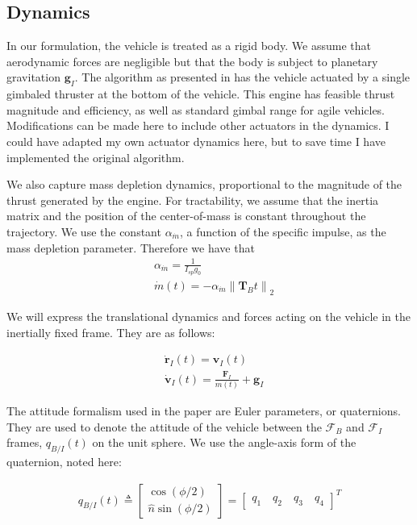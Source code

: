\documentclass[conf]{new-aiaa}
\begin{document}
\begin{singlespace}
\subsection{Dynamics}
In our formulation, the vehicle is treated as a rigid body. We assume that aerodynamic forces are negligible but that the body is subject to planetary gravitation $\mathbf{g}_I$. The algorithm as presented in \cite{6dofsucc} has the vehicle actuated by a single gimbaled thruster at the bottom of the vehicle. This engine has feasible thrust magnitude and efficiency, as well as standard gimbal range for agile vehicles. Modifications can be made here to include other actuators in the dynamics. I could have adapted my own actuator dynamics here, but to save time I have implemented the original algorithm.

We also capture mass depletion dynamics, proportional to the magnitude of the thrust generated by the engine. For tractability, we assume that the inertia matrix and the position of the center-of-mass is constant throughout the trajectory. We use the constant $\alpha_{\dot{m}}$, a function of the specific impulse, as the mass depletion parameter. Therefore we have that
\begin{align}
& \alpha_{\dot{m}} = \frac{1}{I_{sp} g_0} \\
& \dot{m}(t) = -\alpha_{\dot{m}} \left\lVert \mathbf{T}_B{t} \right\rVert _2
\end{align}

We will express the translational dynamics and forces acting on the vehicle in the inertially fixed frame. They are as follows:

\begin{align}
& \dot{\mathbf{r}}_I(t) = \mathbf{v}_I(t) \\
& \dot{\mathbf{v}}_I(t) = \frac{\mathbf{F}_I}{m(t)} + \mathbf{g}_I
\end{align}

The attitude formalism used in the paper are Euler parameters, or quaternions. They are used to denote the attitude of the vehicle between the $\mathcal{F}_B$ and $\mathcal{F}_I$ frames, $q_{B/I}(t)$ on the unit sphere. We use the angle-axis form of the quaternion, noted here:

\begin{align}
q_{B/I}(t) \triangleq 
	\begin{bmatrix}
	\cos(\phi/2) \\ \hat{n}\sin(\phi/2)
	\end{bmatrix}
	= 
	\begin{bmatrix}
	q_1 \quad q_2 \quad q_3 \quad q_4
	\end{bmatrix}^T
\end{align}


\end{singlespace}
\end{document}
